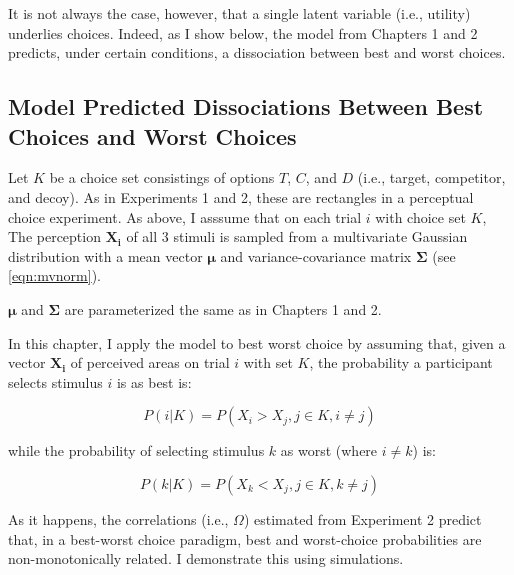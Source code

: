It is not always the case, however, that a single latent variable (i.e., utility) underlies choices. Indeed, as I show below, the model from Chapters 1 and 2 predicts, under certain conditions, a dissociation between best and worst choices.

\subsection{Model Predicted Dissociations Between Best Choices and Worst Choices}

Let $K$ be a choice set consistings of options $T$, $C$, and $D$ (i.e., target, competitor, and decoy). As in Experiments 1 and 2, these are rectangles in a perceptual choice experiment. As above, I asssume that on each trial $i$ with choice set $K$, The perception $\mathbf{X_i}$ of all 3 stimuli is sampled from a multivariate Gaussian distribution with a mean vector $\boldsymbol{\mu}$ and variance-covariance matrix $\boldsymbol{\Sigma}$ (see \ref{eqn:mvnorm}).

$\boldsymbol{\mu}$ and $\boldsymbol{\Sigma}$ are parameterized the same as in Chapters 1 and 2. 

In this chapter, I apply the model to best worst choice by assuming that, given a vector $\mathbf{X_{i}}$ of perceived areas on trial $i$ with set $K$, the probability a participant selects stimulus $i$ is as best is:

\begin{equation}
   P(i|K)=P(X_{i}>X_{j}, j \in K, i \neq j)
   \label{eqn:bchoice1}
\end{equation}

while the probability of selecting stimulus $k$ as worst (where $i \neq k$) is:

\begin{equation}
   P(k|K)=P(X_{k}<X_{j}, j \in K, k \neq j)
   \label{eqn:wchoice1}
\end{equation}

As it happens, the correlations (i.e., $\Omega$) estimated from Experiment 2 predict that, in a best-worst choice paradigm, best and worst-choice probabilities are non-monotonically related. I demonstrate this using simulations.

